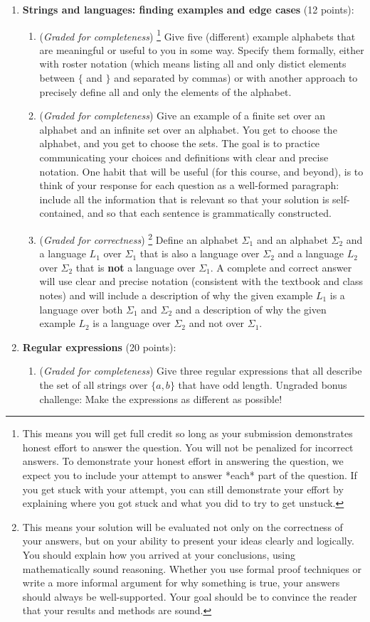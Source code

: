\documentclass[12pt, oneside]{article}
\newcommand{\gradeCorrect}{({\it Graded for correctness}) }
\newcommand{\gradeCorrectFirst}{\gradeCorrect\footnote{This means your solution 
will be evaluated not only on the correctness of your answers, but on your ability
to present your ideas clearly and logically. You should explain how you 
arrived at your conclusions, using
mathematically sound reasoning. Whether you use formal proof techniques or 
write a more informal argument
for why something is true, your answers should always be well-supported. 
Your goal should be to convince the
reader that your results and methods are sound.} }
\newcommand{\gradeComplete}{({\it Graded for completeness}) }
\newcommand{\gradeCompleteFirst}{\gradeComplete\footnote{This means you will 
get full credit so long as your submission demonstrates honest effort to 
answer the question. You will not be penalized for incorrect answers. 
To demonstrate your honest effort in answering the question, we 
expect you to include your attempt to answer *each* part of the question. 
If you get stuck with your attempt, you can still demonstrate 
your effort by explaining where you got stuck and what 
you did to try to get unstuck.} }
\begin{document}
\begin{enumerate}[wide, labelwidth=!, labelindent=0pt]
\item\textbf{Strings and languages: finding examples and edge cases} (12 points):
    \begin{enumerate}
    \item\gradeCompleteFirst  Give five (different) example alphabets that are meaningful or useful to you in some way. Specify them formally, either with 
    roster notation (which means listing all and only distict elements between $\{$ and $\}$ and separated by commas) or with another approach to precisely define all and only the elements of the alphabet.

    \item\gradeComplete Give an example of a finite set over an alphabet  and an infinite set over an alphabet. You get to choose the alphabet, and you get to choose the sets.  The goal is to practice communicating your choices and definitions with clear and precise notation. One habit that will be useful (for this course, and beyond), is to think of your response for each question as a well-formed paragraph: include all the information that is relevant so that your solution is self-contained, and so that each sentence is grammatically constructed.
    
    \item\gradeCorrectFirst Define an alphabet $\Sigma_1$ and an alphabet $\Sigma_2$ and a language $L_1$ over $\Sigma_1$ that is also a language over $\Sigma_2$ and a language $L_2$ over $\Sigma_2$ that is {\bf not} a language over $\Sigma_1$. 
    A complete and correct answer will use clear and precise notation
    (consistent with the textbook and class notes) and will include a description of why the given example $L_1$
    is a language over both $\Sigma_1$ and $\Sigma_2$ and a description 
    of why the given example $L_2$ is a language over $\Sigma_2$ and not over $\Sigma_1$.

    \end{enumerate}

\item\textbf{Regular expressions} (20 points):

    \begin{enumerate}
    \item\gradeComplete  Give three regular expressions that all describe the set of all strings over $\{a,b\}$ that have 
    odd length. Ungraded bonus challenge: Make the expressions as different as possible!


\end{enumerate}
\end{enumerate}
\end{document}
